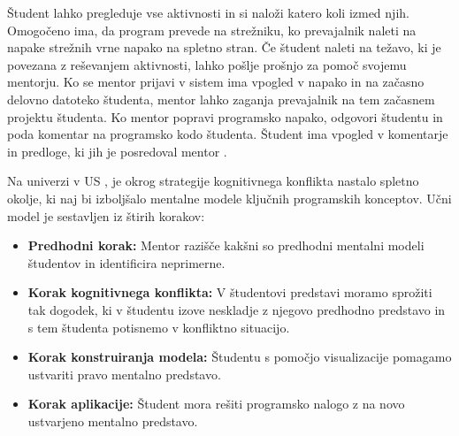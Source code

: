 Študent lahko pregleduje vse aktivnosti in si naloži katero koli izmed
njih. Omogočeno ima, da program prevede na strežniku, ko prevajalnik
naleti na napake strežnih vrne napako na spletno stran. Če študent
naleti na težavo, ki je povezana z reševanjem aktivnosti, lahko pošlje
prošnjo za pomoč svojemu mentorju. Ko se mentor prijavi v sistem ima
vpogled v napako in na začasno delovno datoteko študenta, mentor lahko
zaganja prevajalnik na tem začasnem projektu študenta. Ko mentor
popravi programsko napako, odgovori študentu in poda komentar na
programsko kodo študenta. Študent ima vpogled v komentarje in
predloge, ki jih je posredoval mentor \cite{ITaLCP_DistanceEdu}.


Na univerzi v US \cite{mentalModels}, je okrog strategije kognitivnega konflikta
nastalo spletno okolje, ki naj bi izboljšalo mentalne
modele ključnih programskih konceptov. Učni model je sestavljen iz
štirih korakov:

\begin{itemize}
\item \textbf{Predhodni korak:} Mentor razišče kakšni so predhodni
 mentalni modeli študentov in identificira neprimerne.
\item \textbf{Korak kognitivnega konflikta:} V študentovi predstavi
  moramo sprožiti tak dogodek, ki v študentu izove neskladje z njegovo
  predhodno predstavo in s tem študenta potisnemo v konfliktno
  situacijo.
\item \textbf{Korak konstruiranja modela:} Študentu s pomočjo
  visualizacije pomagamo ustvariti pravo mentalno predstavo.
\item \textbf{Korak aplikacije: } Študent mora rešiti programsko
  nalogo z na novo ustvarjeno mentalno predstavo.
\end{itemize}


